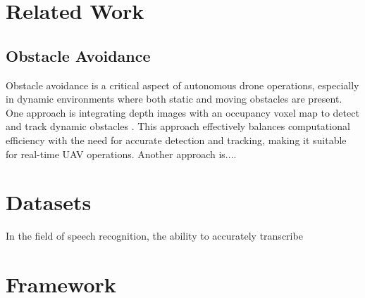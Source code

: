 \documentclass[3p,times]{elsarticle}
\begin{document}






\section{Related Work} \label{sec:related}
\subsection{Obstacle Avoidance}
Obstacle avoidance is a critical aspect of autonomous drone operations, especially in dynamic environments where both static and moving obstacles are present. One approach is integrating depth images with an occupancy voxel map to detect and track dynamic obstacles \cite{xu2023real}. This approach effectively balances computational efficiency with the need for accurate detection and tracking, making it suitable for real-time UAV operations. Another approach is.... \cite{redmon2017yolo9000}





\section{Datasets} \label{sec:datasets}



In the field of speech recognition, the ability to accurately transcribe




\section{Framework} \label{sec:framework}
\end{document}
